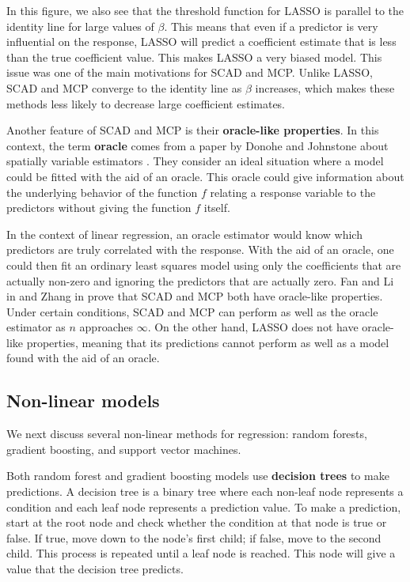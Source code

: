 \documentclass{article}
\begin{document}
In this figure, we also see that the threshold function for LASSO is parallel to the identity line for large values of $\beta$. This means that even if a predictor is very influential on the response, LASSO will predict a coefficient estimate that is less than the true coefficient value. This makes LASSO a very biased model. This issue was one of the main motivations for SCAD and MCP. Unlike LASSO, SCAD and MCP converge to the identity line as $\beta$ increases, which makes these methods less likely to decrease large coefficient estimates.

Another feature of SCAD and MCP is their \textbf{oracle-like properties}. In this context, the term \textbf{oracle} comes from a paper by Donohe and Johnstone about spatially variable estimators \cite{donoho1994ideal}. They consider an ideal situation where a model could be fitted with the aid of an oracle. This oracle could give information about the underlying behavior of the function $f$ relating a response variable to the predictors without giving the function $f$ itself.

In the context of linear regression, an oracle estimator would know which predictors are truly correlated with the response. With the aid of an oracle, one could then fit an ordinary least squares model using only the coefficients that are actually non-zero and ignoring the predictors that are actually zero. Fan and Li in \cite{fan2001variable} and Zhang in \cite{zhang2010nearly} prove that SCAD and MCP both have oracle-like properties. Under certain conditions, SCAD and MCP can perform as well as the oracle estimator as $n$ approaches $\infty$. On the other hand, LASSO does not have oracle-like properties, meaning that its predictions cannot perform as well as a model found with the aid of an oracle.

\subsection{Non-linear models}
We next discuss several non-linear methods for regression: random forests, gradient boosting, and support vector machines.

Both random forest and gradient boosting models use \textbf{decision trees} to make predictions. A decision tree is a binary tree where each non-leaf node represents a condition and each leaf node represents a prediction value. To make a prediction, start at the root node and check whether the condition at that node is true or false. If true, move down to the node's first child; if false, move to the second child. This process is repeated until a leaf node is reached. This node will give a value that the decision tree predicts.
\end{document}

